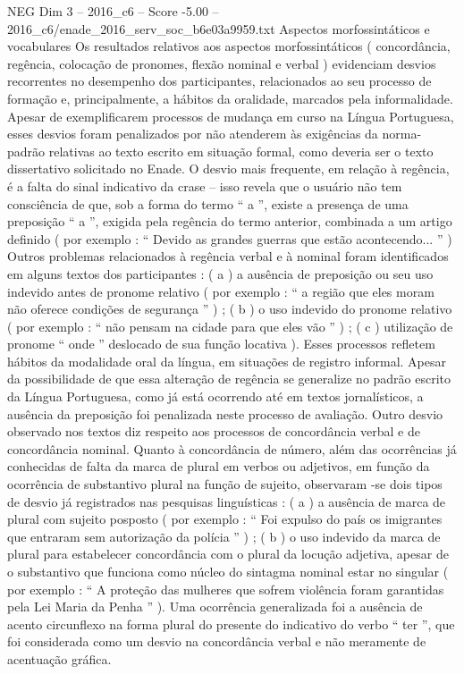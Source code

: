 \begin{textsample}{NEG Dim 3 – 2016\_c6 – Score -5.00 – 2016\_c6/enade\_2016\_serv\_soc\_b6e03a9959.txt}
Aspectos morfossintáticos e vocabulares Os resultados relativos aos aspectos morfossintáticos ( concordância, regência, colocação de pronomes, flexão nominal e verbal ) evidenciam desvios recorrentes no desempenho dos participantes, relacionados ao seu processo de formação e, principalmente, a hábitos da oralidade, marcados pela informalidade.
Apesar de exemplificarem processos de mudança em curso na Língua Portuguesa, esses desvios foram penalizados por não atenderem às exigências da norma-padrão relativas ao texto escrito em situação formal, como deveria ser o texto dissertativo solicitado no Enade.
O desvio mais frequente, em relação à regência, é a falta do sinal indicativo da crase – isso revela que o usuário não tem consciência de que, sob a forma do termo “ a ”, existe a presença de uma preposição “ a ”, exigida pela regência do termo anterior, combinada a um artigo definido ( por exemplo : “ Devido as grandes guerras que estão acontecendo... ” ) Outros problemas relacionados à regência verbal e à nominal foram identificados em alguns textos dos participantes : ( a ) a ausência de preposição ou seu uso indevido antes de pronome relativo ( por exemplo : “ a região que eles moram não oferece condições de segurança ” ) ; ( b ) o uso indevido do pronome relativo ( por exemplo : “ não pensam na cidade para que eles vão ” ) ; ( c ) utilização de pronome “ onde ” deslocado de sua função locativa ).
Esses processos refletem hábitos da modalidade oral da língua, em situações de registro informal.
Apesar da possibilidade de que essa alteração de regência se generalize no padrão escrito da Língua Portuguesa, como já está ocorrendo até em textos jornalísticos, a ausência da preposição foi penalizada neste processo de avaliação.
Outro desvio observado nos textos diz respeito aos processos de concordância verbal e de concordância nominal.
Quanto à concordância de número, além das ocorrências já conhecidas de falta da marca de plural em verbos ou adjetivos, em função da ocorrência de substantivo plural na função de sujeito, observaram -se dois tipos de desvio já registrados nas pesquisas linguísticas : ( a ) a ausência de marca de plural com sujeito posposto ( por exemplo : “ Foi expulso do país os imigrantes que entraram sem autorização da polícia ” ) ; ( b ) o uso indevido da marca de plural para estabelecer concordância com o plural da locução adjetiva, apesar de o substantivo que funciona como núcleo do sintagma nominal estar no singular ( por exemplo : “ A proteção das mulheres que sofrem violência foram garantidas pela Lei Maria da Penha ” ).
Uma ocorrência generalizada foi a ausência de acento circunflexo na forma plural do presente do indicativo do verbo “ ter ”, que foi considerada como um desvio na concordância verbal e não meramente de acentuação gráfica.

\end{textsample}
